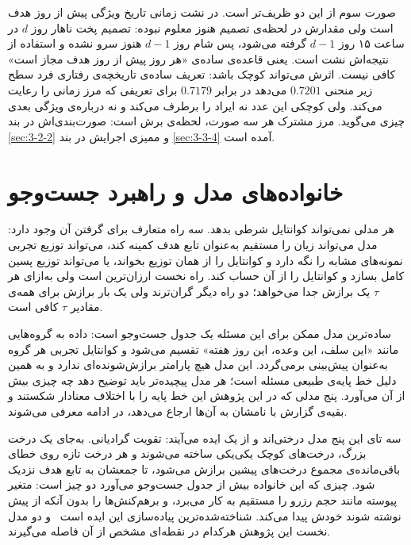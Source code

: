 صورت سوم از این دو ظریف‌تر است. در نشت زمانی تاریخ ویژگی پیش از روز هدف است ولی مقدارش
در لحظه‌ی تصمیم هنوز معلوم نبوده: تصمیم پخت ناهار روز $d$ در ساعت ۱۵ روز $d-1$ گرفته
می‌شود، پس شام روز $d-1$ هنوز سرو نشده و استفاده از نتیجه‌اش نشت است. یعنی قاعده‌ی
ساده‌ی «هر روز پیش از روز هدف مجاز است» کافی نیست. اثرش می‌تواند کوچک باشد: تعریف
ساده‌ی تاریخچه‌ی رفتاری فرد سطح زیر منحنی
$0.7201$ می‌دهد در برابر $0.7179$ برای تعریفی که مرز زمانی را رعایت می‌کند. ولی کوچکی
این عدد نه ایراد را برطرف می‌کند و نه درباره‌ی ویژگی بعدی چیزی می‌گوید. مرز مشترک هر سه
صورت، لحظه‌ی برش است: صورت‌بندی‌اش در بند \ref{sec:3-2-2} و ممیزی اجرایش در بند
\ref{sec:3-3-4} آمده است.

\section{خانواده‌های مدل و راهبرد جست‌وجو}
\label{sec:2-5}

هر مدلی نمی‌تواند کوانتایل شرطی بدهد. سه راه متعارف برای گرفتن آن وجود دارد: مدل
می‌تواند زیان  را مستقیم به‌عنوان تابع هدف کمینه کند، می‌تواند توزیع تجربی
نمونه‌های مشابه را نگه دارد و کوانتایل را از همان توزیع بخواند، یا می‌تواند توزیع پسین
کامل بسازد و کوانتایل را از آن حساب کند. راه نخست ارزان‌ترین است ولی به‌ازای هر $\tau$
یک برازش جدا می‌خواهد؛ دو راه دیگر گران‌ترند ولی یک بار برازش برای همه‌ی مقادیر $\tau$
کافی است.

ساده‌ترین مدل ممکن برای این مسئله یک جدول جست‌وجو است: داده
به گروه‌هایی مانند «این سلف، این وعده، این روز هفته» تقسیم می‌شود و کوانتایل تجربی هر
گروه به‌عنوان پیش‌بینی برمی‌گردد. این مدل هیچ پارامتر برازش‌شونده‌ای ندارد و به همین دلیل
خط پایه‌ی طبیعی مسئله است؛ هر مدل پیچیده‌تر باید توضیح دهد چه چیزی بیش از آن می‌آورد.
پنج مدلی که در این پژوهش این خط پایه را با اختلاف معنادار شکستند و بقیه‌ی گزارش با
نامشان به آن‌ها ارجاع می‌دهد، در ادامه معرفی می‌شوند.

سه تای این پنج مدل درختی‌اند و از یک ایده می‌آیند: تقویت گرادیانی. به‌جای یک درخت بزرگ،
درخت‌های کوچک یکی‌یکی ساخته می‌شوند و هر درخت تازه روی خطای باقی‌مانده‌ی مجموع درخت‌های
پیشین برازش می‌شود، تا جمعشان به تابع هدف نزدیک شود. چیزی که این خانواده بیش از جدول
جست‌وجو می‌آورد دو چیز است: متغیر پیوسته مانند حجم رزرو را مستقیم به کار می‌برد، و
برهم‌کنش‌ها را بدون آنکه از پیش نوشته شوند خودش پیدا می‌کند. شناخته‌شده‌ترین پیاده‌سازی
این ایده  است~\cite{ChenGuestrin16xgboost} و دو مدل نخست این پژوهش هرکدام
در نقطه‌ای مشخص از آن فاصله می‌گیرند.

